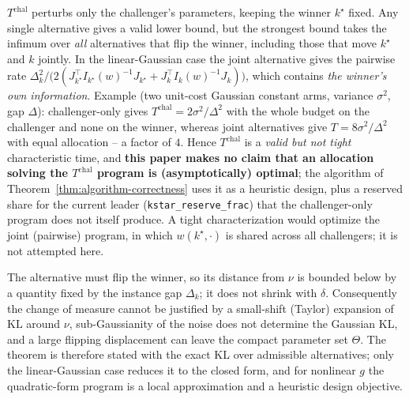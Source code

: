 \begin{remark}
\label{rem:challenger-only}
$T^{\mathrm{chal}}$ perturbs only the challenger's parameters, keeping the winner
$k^\star$ fixed. Any single alternative gives a valid lower bound, but the strongest
bound takes the infimum over \emph{all} alternatives that flip the winner, including
those that move $k^\star$ and $k$ jointly. In the linear-Gaussian case the joint
alternative gives the pairwise rate
$\Delta_k^2 \big/ \big(2(J_{k^\star}^\top I_{k^\star}(w)^{-1} J_{k^\star}
+ J_k^\top I_k(w)^{-1} J_k)\big)$, which contains \emph{the winner's own information}.
Example (two unit-cost Gaussian constant arms, variance $\sigma^2$, gap $\Delta$):
challenger-only gives $T^{\mathrm{chal}} = 2\sigma^2/\Delta^2$ with the whole budget on the
challenger and none on the winner, whereas joint alternatives give
$T = 8\sigma^2/\Delta^2$ with equal allocation -- a factor of $4$. Hence
$T^{\mathrm{chal}}$ is a \emph{valid but not tight} characteristic time, and
\textbf{this paper makes no claim that an allocation solving the $T^{\mathrm{chal}}$
program is (asymptotically) optimal}; the algorithm of Theorem~\ref{thm:algorithm-correctness}
uses it as a heuristic design, plus a reserved share for the current leader
(\texttt{kstar\_reserve\_frac}) that the challenger-only program does not itself
produce. A tight characterization would optimize the joint (pairwise) program, in which
$w(k^\star, \cdot)$ is shared across all challengers; it is not attempted here.
\end{remark}

\begin{remark}
\label{rem:fixed-gap-kl}
The alternative must flip the winner, so its distance from $\nu$ is bounded below by a
quantity fixed by the instance gap $\Delta_k$; it does not shrink with $\delta$.
Consequently the change of measure cannot be justified by a small-shift (Taylor)
expansion of $\mathrm{KL}$ around $\nu$, sub-Gaussianity of the noise does not determine
the Gaussian KL, and a large flipping displacement can leave the compact parameter set
$\Theta$. The theorem is therefore stated with the exact KL over admissible alternatives;
only the linear-Gaussian case reduces it to the closed form, and for nonlinear $g$ the
quadratic-form program is a local approximation and a heuristic design objective.
\end{remark}

